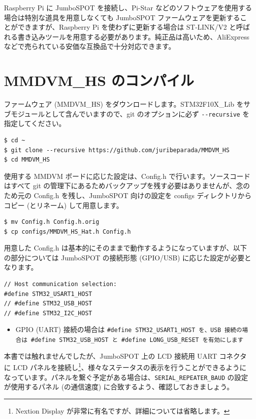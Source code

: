\documentclass[a4j,oneside]{ujbook}
\begin{document}
Raspberry Pi に JumboSPOT を接続し、Pi-Star などのソフトウェアを使用する場合は特別な道具を用意しなくても JumboSPOT ファームウェアを更新することができますが、Raspberry Pi を使わずに更新する場合は ST-LINK/V2 と呼ばれる書き込みツールを用意する必要があります。純正品は高いため、AliExpress などで売られている安価な互換品で十分対応できます。

\section{MMDVM\_HS のコンパイル}

ファームウェア (MMDVM\_HS) をダウンロードします。STM32F10X\_Lib をサブモジュールとして含んでいますので、git のオプションに必ず \verb+--recursive+ を指定してください。

\begin{verbatim}
$ cd ~
$ git clone --recursive https://github.com/juribeparada/MMDVM_HS
$ cd MMDVM_HS
\end{verbatim}

使用する MMDVM ボードに応じた設定は、Config.h で行います。ソースコードはすべて git の管理下にあるためバックアップを残す必要はありませんが、念のため元の Config.h を残し、JumboSPOT 向けの設定を configs ディレクトリからコピー (とリネーム) して用意します。

\begin{verbatim}
$ mv Config.h Config.h.orig
$ cp configs/MMDVM_HS_Hat.h Config.h
\end{verbatim}

用意した Config.h は基本的にそのままで動作するようになっていますが、以下の部分については JumboSPOT の接続形態 (GPIO/USB) に応じた設定が必要となります。

\begin{verbatim}
// Host communication selection:
#define STM32_USART1_HOST
// #define STM32_USB_HOST
// #define STM32_I2C_HOST
\end{verbatim}
\begin{itemize}
 \renewcommand{\labelitemi}{$\triangleright$}
 \item GPIO (UART) 接続の場合は \tt{\#define STM32\_USART1\_HOST} を、USB 接続の場合は \tt{\#define STM32\_USB\_HOST} と \tt{\#define LONG\_USB\_RESET} を有効にします
\end{itemize}

本書では触れませんでしたが、JumboSPOT 上の LCD 接続用 UART コネクタに LCD パネルを接続し\footnote{Nextion Display が非常に有名ですが、詳細については省略します。}、様々なステータスの表示を行うことができるようになっています。パネルを繋ぐ予定がある場合は、\verb+SERIAL_REPEATER_BAUD+ の設定が使用するパネル (の通信速度) に合致するよう、確認しておきましょう。
\end{document}
